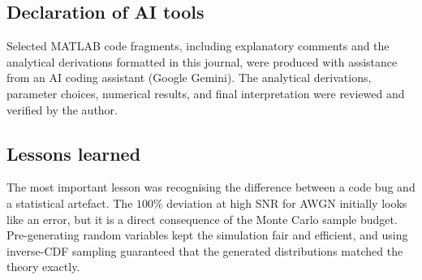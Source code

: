 \documentclass[12pt,a4paper]{article}
\begin{document}
\subsection{Declaration of AI tools}
Selected MATLAB code fragments, including explanatory comments and the analytical derivations formatted in this journal, were produced with assistance from an AI coding assistant (Google Gemini). The analytical derivations, parameter choices, numerical results, and final interpretation were reviewed and verified by the author.

\subsection{Lessons learned}
The most important lesson was recognising the difference between a code bug and a statistical artefact. The $100\%$ deviation at high SNR for AWGN initially looks like an error, but it is a direct consequence of the Monte Carlo sample budget. Pre-generating random variables kept the simulation fair and efficient, and using inverse-CDF sampling guaranteed that the generated distributions matched the theory exactly.

\end{document}
